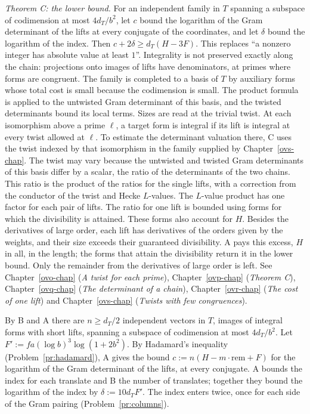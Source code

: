 \documentclass[reqno]{amsart}
\newcounter{chap}
\theoremstyle{definition}
\newcommand{\rem}{\mathrm{rem}}
\begin{document}
\emph{Theorem C: the lower bound.}  For an independent family in
\(T\) spanning a subspace of codimension at most \(4 d_T/b^2\), let
\(c\) bound the logarithm of the Gram determinant of the lifts at
every conjugate of the coordinates, and let \(\delta\) bound the
logarithm of the index.  Then \(c + 2\delta \ge d_T (H - 3F)\).
This replaces ``a nonzero integer has
absolute value at least \(1\)''.  Integrality is not preserved
exactly along the chain: projections onto images of lifts have
denominators, at primes where forms are congruent.  The family is
completed to a basis of \(T\) by auxiliary forms whose total cost is
small because the codimension is small.  The product formula is
applied to the untwisted Gram determinant of this basis, and the
twisted determinants bound its local terms.  Sizes are read at
the trivial twist.  At each isomorphism above a prime \(\ell\), a target
form is integral if its lift is integral at every twist allowed at \(\ell\).  To estimate
the determinant valuation there, C uses the twist indexed by that
isomorphism in the family supplied by Chapter~\ref{ovs-chap}.
The twist may vary because the untwisted and twisted Gram determinants
of this basis differ by a scalar, the ratio of the determinants of
the two chains.  This ratio is the
product of the ratios for the single lifts, with a correction from
the conductor of the twist and Hecke \(L\)-values.  The
\(L\)-value product has one factor for each pair of lifts.  The
ratio for one lift is bounded using forms for
which the divisibility is attained.  These forms also account for
\(H\).  Besides the derivatives of large order, each lift has
derivatives of the orders given by the weights, and their size
exceeds their guaranteed divisibility.  A pays this excess, \(H\)
in all, in the length; the forms that attain the divisibility
return it in the lower bound.  Only the remainder from the
derivatives of large order is left.  See
Chapter~\ref{ovo-chap} (\emph{A twist for each prime}),
Chapter~\ref{ovp-chap} (\emph{Theorem C}),
Chapter~\ref{ovq-chap} (\emph{The determinant of a chain}),
Chapter~\ref{ovr-chap} (\emph{The cost of one lift}) and
Chapter~\ref{ovs-chap} (\emph{Twists with few congruences}).

By B and A there are \(n \ge d_T/2\) independent vectors in \(T\),
images of integral forms with short lifts, spanning a subspace of
codimension at most \(4 d_T/b^2\).  Let
\(F' := f a (\log b)^3 \log(1 + 2b^2)\).  By Hadamard's inequality
(Problem~\ref{pr:hadamard}), A gives the bound
\(c := n (H - m \cdot \rem + F)\) for the logarithm of the Gram
determinant of the lifts, at every conjugate.  A bounds the index for each translate
and B the number of translates; together they bound the logarithm
of the index by \(\delta := 10 d_T F'\).  The index enters twice,
once for each side of the Gram pairing
(Problem~\ref{pr:columns}).
\end{document}
